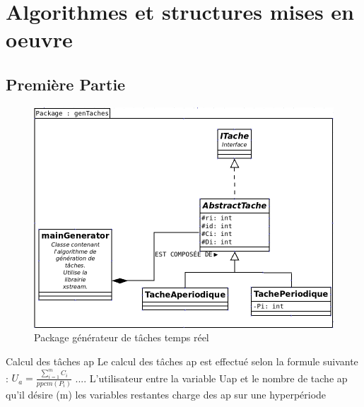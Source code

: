 \section{Algorithmes et structures mises en oeuvre}
\subsection{Première Partie}
   \begin{figure}[htbp]
  \centering
  \includegraphics[scale=0.60]{img/packgen}
  \caption{Package générateur de tâches temps réel}
  \label{fig:gen}
\end{figure}

Calcul des tâches ap  
Le calcul des tâches ap est effectué selon la formule suivante : $ U_a =  \frac{\sum_{i=1}^m C_i}{ppcm(P_i)}$   ....  L'utilisateur entre la variable Uap  et le nombre de tache ap qu'il désire (m) les variables restantes 
charge des ap sur une hyperpériode 

